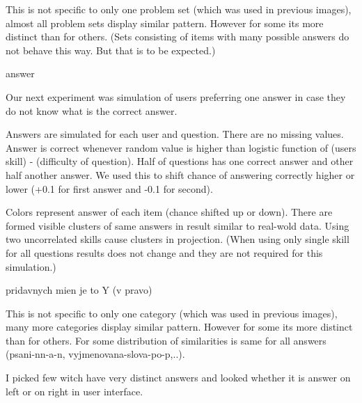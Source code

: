 \documentclass[
  digital, %
  table,   %
  nolof,     %
  nolot,     %
  nocover
]{fithesis3}
\begin{document}

This is not specific to only one problem set (which was used in previous
images), almost all problem sets display similar pattern. However for
some its more distinct than for others. (Sets consisting of items with
many possible answers do not behave this way. But that is to be
expected.)

answer

Our next experiment was simulation of users preferring one answer in
case they do not know what is the correct answer.

Answers are simulated for each user and question. There are no missing
values. Answer is correct whenever random value is higher than logistic
function of (users skill) - (difficulty of question). Half of questions
has one correct answer and other half another answer. We used this to
shift chance of answering correctly higher or lower (+0.1 for first
answer and -0.1 for second).


Colors represent answer of each item (chance shifted up or down). There
are formed visible clusters of same answers in result similar to
real-wold data. Using two uncorrelated skills cause clusters in
projection. (When using only single skill for all questions results does
not change and they are not required for this simulation.)

pridavnych mien je to Y (v pravo)

This is not specific to only one category (which was used in previous
images), many more categories display similar pattern. However for some
its more distinct than for others. For some distribution of similarities
is same for all answers (psani-nn-a-n, vyjmenovana-slova-po-p,..).

I picked few witch have very distinct answers and looked whether it is
answer on left or on right in user interface.

\end{document}
